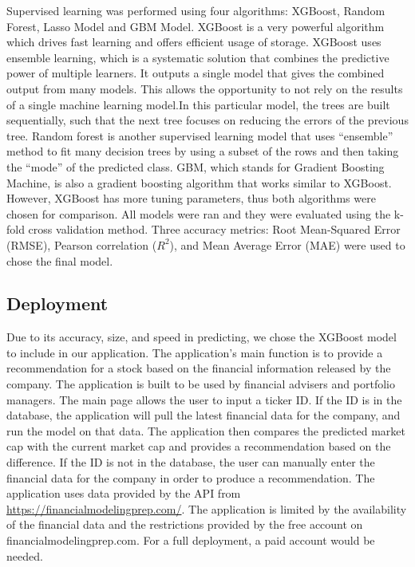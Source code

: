 \documentclass[11pt,]{article}
\begin{document}
Supervised learning was performed using four algorithms: XGBoost, Random
Forest, Lasso Model and GBM Model. XGBoost is a very powerful algorithm
which drives fast learning and offers efficient usage of storage.
XGBoost uses ensemble learning, which is a systematic solution that
combines the predictive power of multiple learners. It outputs a single
model that gives the combined output from many models. This allows the
opportunity to not rely on the results of a single machine learning
model.In this particular model, the trees are built sequentially, such
that the next tree focuses on reducing the errors of the previous tree.
Random forest is another supervised learning model that uses
``ensemble'' method to fit many decision trees by using a subset of the
rows and then taking the ``mode'' of the predicted class. GBM, which
stands for Gradient Boosting Machine, is also a gradient boosting
algorithm that works similar to XGBoost. However, XGBoost has more
tuning parameters, thus both algorithms were chosen for comparison. All
models were ran and they were evaluated using the k-fold cross
validation method. Three accuracy metrics: Root Mean-Squared Error
(RMSE), Pearson correlation (\(R^2\)), and Mean Average Error (MAE) were
used to chose the final model.

\hypertarget{deployment}{%
\subsection{Deployment}\label{deployment}}

Due to its accuracy, size, and speed in predicting, we chose the XGBoost
model to include in our application. The application's main function is
to provide a recommendation for a stock based on the financial
information released by the company. The application is built to be used
by financial advisers and portfolio managers. The main page allows the
user to input a ticker ID. If the ID is in the database, the application
will pull the latest financial data for the company, and run the model
on that data. The application then compares the predicted market cap
with the current market cap and provides a recommendation based on the
difference. If the ID is not in the database, the user can manually
enter the financial data for the company in order to produce a
recommendation. The application uses data provided by the API from
\url{https://financialmodelingprep.com/}. The application is limited by
the availability of the financial data and the restrictions provided by
the free account on financialmodelingprep.com. For a full deployment, a
paid account would be needed.
\end{document}

